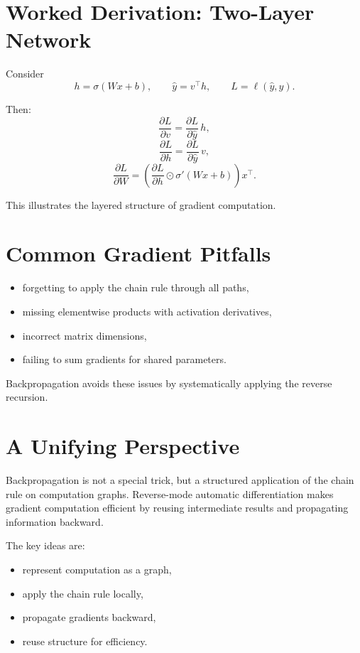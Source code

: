 \section{Worked Derivation: Two-Layer Network}

Consider
\[
h = \sigma(Wx + b),\qquad
\hat{y} = v^\top h,\qquad
L = \ell(\hat{y}, y).
\]

Then:
\[
\frac{\partial L}{\partial v} = \frac{\partial L}{\partial \hat{y}}\, h,
\]
\[
\frac{\partial L}{\partial h} = \frac{\partial L}{\partial \hat{y}}\, v,
\]
\[
\frac{\partial L}{\partial W}
=
\left( \frac{\partial L}{\partial h} \odot \sigma'(Wx+b) \right) x^\top.
\]

This illustrates the layered structure of gradient computation.

\section{Common Gradient Pitfalls}

\begin{itemize}
    \item forgetting to apply the chain rule through all paths,
    \item missing elementwise products with activation derivatives,
    \item incorrect matrix dimensions,
    \item failing to sum gradients for shared parameters.
\end{itemize}

Backpropagation avoids these issues by systematically applying the reverse recursion.

\section{A Unifying Perspective}

Backpropagation is not a special trick, but a structured application of the chain rule on computation graphs. Reverse-mode automatic differentiation makes gradient computation efficient by reusing intermediate results and propagating information backward.

The key ideas are:
\begin{itemize}
    \item represent computation as a graph,
    \item apply the chain rule locally,
    \item propagate gradients backward,
    \item reuse structure for efficiency.
\end{itemize}

